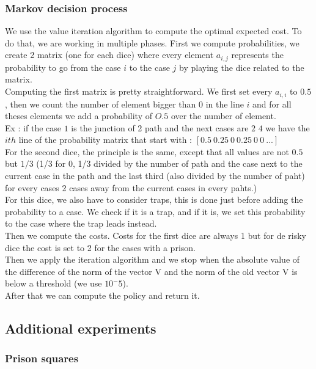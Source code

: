 \documentclass{eplDoc}
\begin{document}
\subsubsection{Markov decision process}
We use the value iteration algorithm to compute the optimal expected cost. 
To do that, we are working in multiple phases.  First we compute probabilities, 
we create 2 matrix (one for each dice) where every element $a_{i,j}$ represents 
the probability to go from the case $i$ to the case $j$ by playing the dice related to the matrix.\\
Computing the first matrix is pretty straightforward.  We first set every $a_{i,i}$ to $0.5$, then we count the number of element bigger than $0$ in the line $i$ and for all theses elements we add a probability of $O.5$ over the number of element. \\
Ex : if the case $1$ is the junction of 2 path and the next cases are $2$ $4$ we have the $i th$ line of the probability matrix that start with : $[0.5\  0.25\ 0\ 0.25\ 0\ 0\ ...]$\\
For the second dice, the principle is the same, except that all values are not $0.5$ but $1/3$ (1/3 for 0,  1/3 divided by the number of path and the case next to the current case in the path and the last third (also divided by the number of paht) for every cases 2 cases away from the current cases in every pahts.)\\
For this dice, we also have to consider traps, this is done just before adding the probability to a case. We check if it is a trap, and if it is, we set this probability to the case where the trap leads instead.\\
Then we compute the costs.  Costs for the first dice are always 1 but for de risky dice the cost is set to 2 for the cases with a prison.\\
Then we apply the iteration algorithm and we stop when the absolute value of the difference of the norm of the vector V and the norm of the old vector V is below a threshold (we use $10^-5$).\\
After that we can compute the policy and return it.





\subsection{Additional experiments}


\subsubsection{Prison squares}
\end{document}
